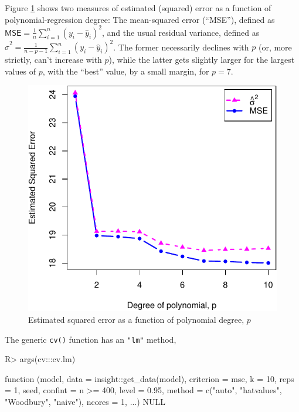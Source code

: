 \documentclass[
]{jss}
\begin{document}
Figure \ref{fig:mpg-horsepower-MSE-se} shows two measures of estimated
(squared) error as a function of polynomial-regression degree: The
mean-squared error (``MSE''), defined as
\(\mathsf{MSE} = \frac{1}{n}\sum_{i=1}^n (y_i - \widehat{y}_i)^2\), and
the usual residual variance, defined as
\(\widehat{\sigma}^2 = \frac{1}{n - p - 1} \sum_{i=1}^n (y_i - \widehat{y}_i)^2\).
The former necessarily declines with \(p\) (or, more strictly, can't
increase with \(p\)), while the latter gets slightly larger for the
largest values of \(p\), with the ``best'' value, by a small margin, for
\(p = 7\).

\begin{CodeChunk}
\begin{figure}

{\centering \includegraphics[width=0.5\linewidth]{JSS-article-reduced-2_files/figure-latex/mpg-horsepower-MSE-se-1} 

}

\caption[Estimated squared error as a function of polynomial degree, $p$]{Estimated squared error as a function of polynomial degree, $p$}\label{fig:mpg-horsepower-MSE-se}
\end{figure}
\end{CodeChunk}

The generic \texttt{cv()} function has an \texttt{"lm"} method,

\begin{CodeChunk}
\begin{CodeInput}
R> args(cv:::cv.lm)
\end{CodeInput}
\begin{CodeOutput}
function (model, data = insight::get_data(model), criterion = mse, 
    k = 10, reps = 1, seed, confint = n >= 400, level = 0.95, 
    method = c("auto", "hatvalues", "Woodbury", "naive"), ncores = 1, 
    ...) 
NULL
\end{CodeOutput}
\end{CodeChunk}
\end{document}
